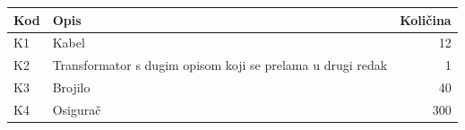 \documentclass[a4paper]{article}
\begin{document}
\begin{tabular}{|l|p{5cm}|r|}
\hline
Kod & Opis & Količina \\
\hline
K1 & Kabel & 12 \\
K2 & Transformator s dugim opisom koji se prelama u drugi redak & 1 \\
K3 & Brojilo & 40 \\
K4 & Osigurač & 300 \\
\hline
\end{tabular}
\end{document}
